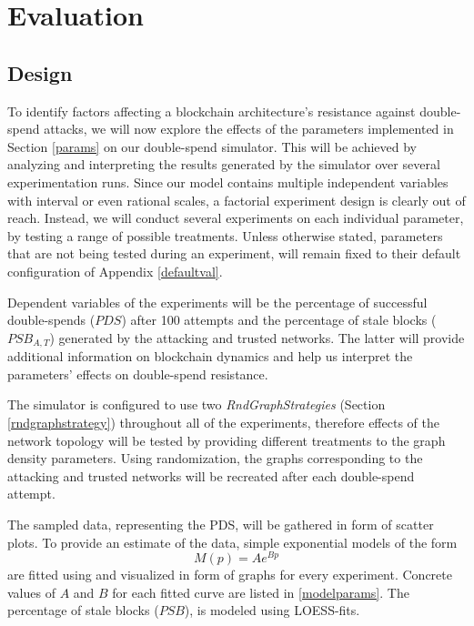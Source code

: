 \documentclass[a4paper,12pt,twoside]{report}
\begin{document}
\chapter{Evaluation} \label{eval}

\section{Design} \label{design}
To identify factors affecting a blockchain architecture's resistance against double-spend attacks, we will now explore the effects of the parameters implemented in Section \ref{params} on our double-spend simulator. This will be achieved by analyzing and interpreting the results generated by the simulator over several experimentation runs. Since our model contains multiple independent variables with interval or even rational scales, a factorial experiment design is clearly out of reach. Instead, we will conduct several experiments on each individual parameter, by testing a range of possible treatments. Unless otherwise stated, parameters that are not being tested during an experiment, will remain fixed to their default configuration of Appendix \ref{defaultval}. 

Dependent variables of the experiments will be the percentage of successful double-spends ($PDS$) after 100 attempts and the percentage of stale blocks ($PSB_{A,T}$) generated by the attacking and trusted networks. The latter will provide additional information on blockchain dynamics and help us interpret the parameters' effects on double-spend resistance. 

The simulator is configured to use two \textit{RndGraphStrategies} (Section \ref{rndgraphstrategy}) throughout all of the experiments, therefore effects of the network topology will be tested by providing different treatments to the graph density parameters. Using randomization, the graphs corresponding to the attacking and trusted networks will be recreated after each double-spend attempt. 

The sampled data, representing the PDS, will be gathered in form of scatter plots. To provide an estimate of the data, simple exponential models of the form
\begin{equation}\label{model}
M(p) = Ae^{Bp}
\end{equation}
are fitted using \cite{nlxb} and visualized in form of graphs for every experiment. Concrete values of $A$ and $B$ for each fitted curve are listed in \autoref{modelparams}. The percentage of stale blocks ($PSB$), is modeled using LOESS-fits. 
\end{document}
